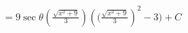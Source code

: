 \documentclass[preview]{standalone}
\begin{document}
\begin{align*}
&=9\sec\theta(\frac{\sqrt{x^2+9}}{3})({(\frac{\sqrt{x^2+9}}{3}})^2-3)+C \\
\end{align*}
\end{document}
